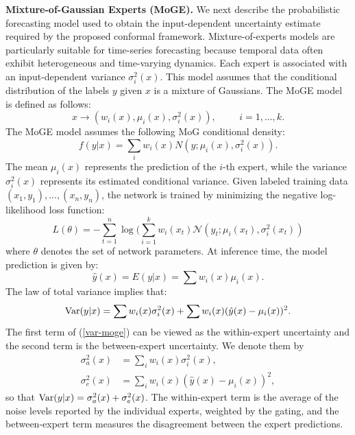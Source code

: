 {\bf Mixture-of-Gaussian Experts (MoGE).}
We next describe the probabilistic forecasting model used to obtain the input-dependent uncertainty estimate required by the proposed conformal framework.
 Mixture-of-experts models are particularly suitable for time-series forecasting because temporal data often exhibit heterogeneous and time-varying dynamics.
Each expert is associated with an input-dependent variance 
$\sigma^2_i(x)$.
This model assumes that the conditional distribution of the labels $y$ given $x$  is a mixture of Gaussians. 
The MoGE model is defined as follows:  
\begin{equation}\label{eq:mog}
    x  \rightarrow  ( w_i(x), \mu_i(x), \sigma^2_i(x)), \hspace{1cm} i=1,...,k. 
\end{equation}
The MoGE model assumes the following MoG conditional density:
\begin{equation}
f(y|x) = \sum_i w_i(x) N ( y ; \mu_i(x), \sigma_i^2 (x)).
\label{eq:mogdensity}
\end{equation}
The mean $\mu_i(x)$ represents the prediction of the $i$-th expert,  while the variance $\sigma_i^2(x)$ 
represents its estimated conditional variance.
Given  labeled training data $(x_1,y_1),...,(x_n,y_n)$,
the network is trained by minimizing the negative log-likelihood loss function:
\begin{equation}
L(\theta) = -\sum_{t=1}^n \log (\sum_{i=1}^k w_i(x_t) \mathcal{N}(y_t; \mu_i(x_t),\sigma_i^2(x_t))
\label{nll}
\end{equation}
 where $\theta$ denotes the set of network parameters.
At inference time, the model prediction is given by:
 \begin{equation}
 \hat{y}(x) = E ( y|x) = \sum w_i(x)\mu_i(x).
 \end{equation}
The law of total variance implies that:
\begin{equation}
\mathrm{Var}(y|x)  = \sum w_i(x) \sigma_i^2(x) +  \sum w_i(x) (\hat{y}(x)-\mu_i(x))^2.
\label{var-moge}
\end{equation}
The first term of (\ref{var-moge}) can be viewed as the within-expert uncertainty and the second term is the between-expert uncertainty. We denote them by
\begin{align}
\sigma_a^2(x) &= \sum_i w_i(x) \sigma_i^2(x), \label{eq:aleat}\\
\sigma_e^2(x) &= \sum_i w_i(x) (\hat{y}(x)-\mu_i(x))^2, \label{eq:epist}
\end{align}
so that $\mathrm{Var}(y|x)=\sigma_a^2(x)+\sigma_e^2(x)$. The within-expert term is the average of the noise levels reported by the individual experts, weighted by the gating, and the between-expert term measures the disagreement between the expert predictions.


